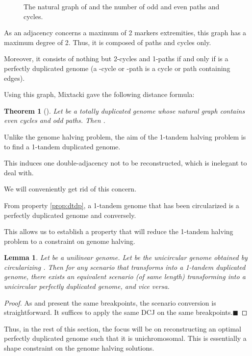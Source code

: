 \documentclass[11pt,final,twoside,nofrench]{thlifl}
\newcommand{\qed}{\ensuremath{\blacksquare}}
\newtheorem{proof}{Proof}
\newtheorem{theorem}{Theorem}
\newtheorem{lemma}{Lemma}
\begin{document}
{\begin{figure}
\begin{tikzpicture}[scale=1]
\end{tikzpicture}
\caption{The natural graph of  and the number of odd
  and even paths and cycles.}
\label{fig:NG} 
\end{figure}
As an adjacency concerns a maximum of 2 markers extremities, this graph has
a maximum degree of 2. Thus, it is composed of paths and cycles only.

Moreover, it consists of nothing but 2-cycles and 1-paths if and only
if  is a perfectly duplicated genome (a -cycle or -path is a
cycle or path containing  edges).

Using this graph, Mixtacki gave the following distance formula:
\begin{theorem}[\cite{Mixtacki08}]
Let  be a totally duplicated genome whose natural graph contains  even
cycles and  odd paths.
Then  .
\label{th:dp}
\end{theorem}
Unlike the genome halving problem, the aim of the 1-tandem halving
problem is to find a 1-tandem duplicated genome.

This induces one double-adjacency not to be reconstructed, which is
inelegant to deal with.

We will conveniently get rid of this concern.

From property \ref{prop:dtdp}, a 1-tandem genome that has been
circularized is a perfectly duplicated genome and conversely.

This allows us to establish a property that will reduce the 1-tandem
halving problem to a constraint on genome halving.

\begin{lemma}
\label{lem:unicirc=tandem}
Let  be a unilinear genome. Let  be the unicircular genome obtained by circularizing .
Then for any scenario that transforms  into a 1-tandem duplicated genome, there exists an equivalent scenario (of same length) transforming  into a unicircular perfectly duplicated genome, and vice versa.
\end{lemma}

\begin{proof}
As  and  present the same breakpoints, the scenario conversion is straightforward. It suffices to apply the same DCJ on the same breakpoints.\qed
\end{proof}

Thus, in the rest of this section, the focus will be on reconstructing
an optimal perfectly duplicated genome such that it is unichromosomal.
This is essentially a shape constraint on the genome halving
solutions.

}
\end{document}
